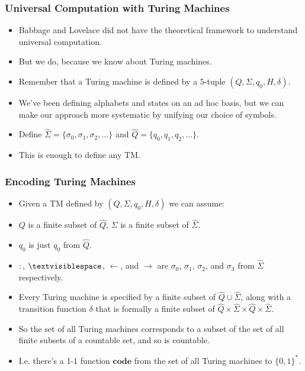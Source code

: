 \documentclass[handout]{beamer}
\newcommand{\tvs}{\textvisiblespace}
\newcommand{\ra}{\rightarrow}
\newcommand{\la}{\leftarrow}
\newcommand{\co}{\mathbf{code}}
\begin{document}
\begin{frame}
\frametitle{Universal Computation with Turing Machines}
\begin{itemize}
\item Babbage and Lovelace did not have the theoretical framework to understand universal computation.
\vspace{0.3cm}
\item But we do, because we know about Turing machines.
\vspace{0.3cm}
\item Remember that a Turing machine is defined by a $5$-tuple $(Q,\Sigma,q_0,H,\delta)$.
\vspace{0.3cm}
\item We've been defining alphabets and states on an ad hoc basis, but we can make our approach more systematic by unifying our choice of symbols.
\vspace{0.3cm}
\item Define $\hat{\Sigma}=\{\sigma_0,\sigma_1,\sigma_2,\ldots\}$ and $\hat{Q}=\{q_0,q_1,q_2,\ldots\}$.
\vspace{0.3cm}
\item This is enough to define any TM.
\end{itemize}
\end{frame}

\begin{frame}
\frametitle{Encoding Turing Machines}
\begin{itemize}
\item Given a TM defined by $(Q,\Sigma,q_0,H,\delta)$ we can assume:
\vspace{0.2cm}
\item $Q$ is a finite subset of $\hat{Q}$, $\Sigma$ is a finite subset of $\hat{\Sigma}$. 
\vspace{0.2cm}
\item $q_0$ is just $q_0$ from $\hat{Q}$. 
\vspace{0.2cm}
\item $:$, $\tvs$, $\la$, and $\ra$ are $\sigma_0$, $\sigma_1$, $\sigma_2$, and $\sigma_3$ from $\hat{\Sigma}$ respectively.
\vspace{0.2cm}
\item Every Turing machine is specified by a finite subset of $\hat{Q}\cup\hat{\Sigma}$, along with a transition function $\delta$ that is formally a finite subset of $\hat{Q}\times\hat{\Sigma}\times\hat{Q}\times\hat{\Sigma}$. 
\vspace{0.2cm}
\item So the set of all Turing machines corresponds to a subset of the set of all finite subsets of a countable set, and so is countable. 
\vspace{0.2cm}
\item I.e. there's a 1-1 function $\co$  from the set of all Turing machines to $\{0,1\}^*$.
\end{itemize}
\end{frame}
\end{document}
